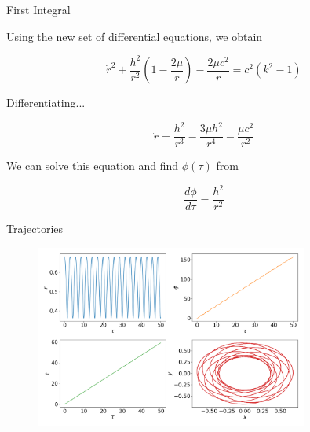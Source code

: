 \documentclass[xcolor=dvipsnames]{beamer}
\begin{document}
\begin{frame}{First Integral}
    
Using the new set of differential equations, we obtain

\begin{equation*}
\dot{r}^2 + \frac{h^2}{r^2} \left(1 - \frac{2\mu}{r} \right) - \frac{2 \mu c^2}{r} = c^2 (k^2 - 1)
\end{equation*}

Differentiating...

\begin{block}{}
\begin{equation*}
    \ddot{r} = \frac{h^2}{r^3} - \frac{3\mu h^2}{r^4} - \frac{\mu c^2}{r^2}
\end{equation*}
\end{block}

We can solve this equation and find $\phi(\tau)$ from 

\begin{equation*}
    \frac{d\phi}{d\tau} = \frac{h^2}{r^2}
\end{equation*}


\end{frame}




\begin{frame}{Trajectories}

\begin{figure}[h!]
    \centering
    \includegraphics[width=0.8\textwidth]{Presentations/Images/2_first_orbits.png}
\end{figure}
    
\end{frame}
\end{document}

